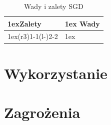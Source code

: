 \begin{table}[h]
    \begin{tabularx}{\linewidth}{>{\parskip1ex}X@{\kern4\tabcolsep}>{\parskip1ex}X}
    \toprule
    \hfil\bfseries Zalety
    &
    \hfil\bfseries Wady
    \\\cmidrule(r{3\tabcolsep}){1-1}\cmidrule(l{-\tabcolsep}){2-2}
    
    \par
    \par
    
    &
    
    \par
    \par
    
    \\\bottomrule
    \end{tabularx}
    \caption{Wady i zalety SGD}
\end{table}

\section{Wykorzystanie}

\section{Zagrożenia}
